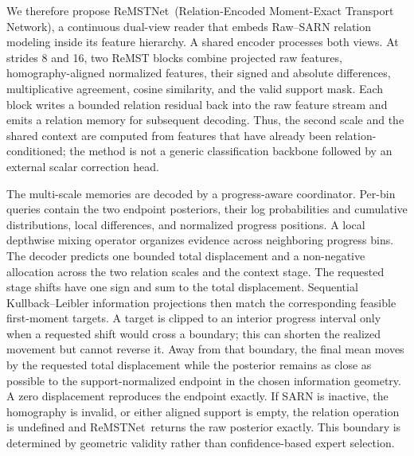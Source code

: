 \documentclass[electronics,article,submit,oneauthor]{Definitions/mdpi}
\newcommand{\modelname}{ReMSTNet}
\begin{document}
We therefore propose \modelname\ (Relation-Encoded Moment-Exact Transport Network), a continuous dual-view reader that embeds Raw--SARN relation modeling inside its feature hierarchy. A shared encoder processes both views. At strides 8 and 16, two ReMST blocks combine projected raw features, homography-aligned normalized features, their signed and absolute differences, multiplicative agreement, cosine similarity, and the valid support mask. Each block writes a bounded relation residual back into the raw feature stream and emits a relation memory for subsequent decoding. Thus, the second scale and the shared context are computed from features that have already been relation-conditioned; the method is not a generic classification backbone followed by an external scalar correction head.

The multi-scale memories are decoded by a progress-aware coordinator. Per-bin queries contain the two endpoint posteriors, their log probabilities and cumulative distributions, local differences, and normalized progress positions. A local depthwise mixing operator organizes evidence across neighboring progress bins. The decoder predicts one bounded total displacement and a non-negative allocation across the two relation scales and the context stage. The requested stage shifts have one sign and sum to the total displacement. Sequential Kullback--Leibler information projections then match the corresponding feasible first-moment targets. A target is clipped to an interior progress interval only when a requested shift would cross a boundary; this can shorten the realized movement but cannot reverse it. Away from that boundary, the final mean moves by the requested total displacement while the posterior remains as close as possible to the support-normalized endpoint in the chosen information geometry. A zero displacement reproduces the endpoint exactly. If SARN is inactive, the homography is invalid, or either aligned support is empty, the relation operation is undefined and \modelname\ returns the raw posterior exactly. This boundary is determined by geometric validity rather than confidence-based expert selection.
\end{document}
